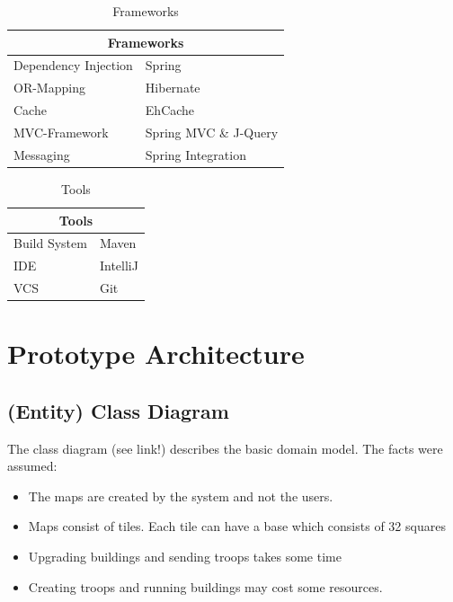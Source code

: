 \documentclass[11pt]{article}
\begin{document}
\begin{table}[h]
	\begin{tabularx}{\textwidth}{| X | X |}
	\hline
	\multicolumn{2}{|c|}{\textbf{Frameworks}} \\
	\hline
	\cellcolor[gray]{0.9}
	Dependency Injection & Spring\\
	\hline
	\cellcolor[gray]{0.9}
	OR-Mapping & Hibernate\\
	\hline
	\cellcolor[gray]{0.9}
	Cache & EhCache\\
	\hline
	\cellcolor[gray]{0.9}
	MVC-Framework & Spring MVC \& J-Query\\
	\hline
	\cellcolor[gray]{0.9}
	Messaging & Spring Integration\\
	\hline
	\end{tabularx}
	\caption{Frameworks}
	\label{frameworks}
\end{table}


\begin{table}[h]
	\begin{tabularx}{\textwidth}{| X | X |}
	\hline
	\multicolumn{2}{|c|}{\textbf{Tools}} \\
	\hline
	\cellcolor[gray]{0.9}
	Build System & Maven\\
	\hline
	\cellcolor[gray]{0.9}
	IDE & IntelliJ\\
	\hline
	\cellcolor[gray]{0.9}
	VCS & Git\\
	\hline
	\end{tabularx}
	\caption{Tools}
	\label{tools}
\end{table}

\section{Prototype Architecture}

\subsection{(Entity) Class Diagram}

The class diagram (see link!) describes the basic domain model. The facts were assumed:

\begin{itemize}
\item The maps are created by the system and not the users.
\item Maps consist of tiles. Each tile can have a base which consists of 32 squares
\item Upgrading buildings and sending troops takes some time
\item Creating troops and running buildings may cost some resources.
\end{itemize}
\end{document}
